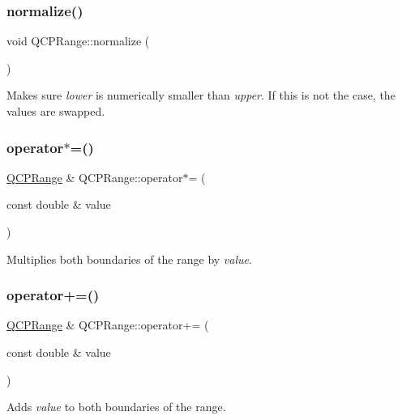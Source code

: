 \subsubsection{\texorpdfstring{normalize()}{normalize()}}
{\footnotesize\ttfamily void Q\+C\+P\+Range\+::normalize (\begin{DoxyParamCaption}{ }\end{DoxyParamCaption})\hspace{0.3cm}{\ttfamily [inline]}}

Makes sure {\itshape lower} is numerically smaller than {\itshape upper}. If this is not the case, the values are swapped. \mbox{\label{class_q_c_p_range_a6876aa9620ff2f0f7f1873f998372cef}} 
\subsubsection{\texorpdfstring{operator$\ast$=()}{operator*=()}}
{\footnotesize\ttfamily \hyperlink{class_q_c_p_range}{Q\+C\+P\+Range} \& Q\+C\+P\+Range\+::operator$\ast$= (\begin{DoxyParamCaption}\item[{const double \&}]{value }\end{DoxyParamCaption})\hspace{0.3cm}{\ttfamily [inline]}}

Multiplies both boundaries of the range by {\itshape value}. \mbox{\label{class_q_c_p_range_afea7c1aa7d08f061cd9bd8832f957df8}} 
\subsubsection{\texorpdfstring{operator+=()}{operator+=()}}
{\footnotesize\ttfamily \hyperlink{class_q_c_p_range}{Q\+C\+P\+Range} \& Q\+C\+P\+Range\+::operator+= (\begin{DoxyParamCaption}\item[{const double \&}]{value }\end{DoxyParamCaption})\hspace{0.3cm}{\ttfamily [inline]}}

Adds {\itshape value} to both boundaries of the range. \mbox{\label{class_q_c_p_range_a95894bcb15a16a75ca564091374e2191}} 
